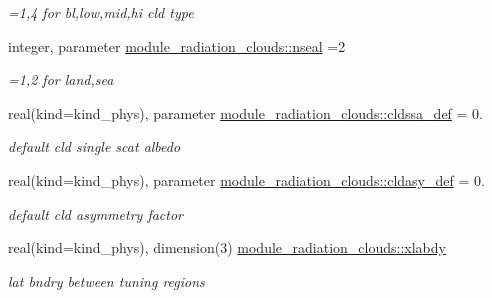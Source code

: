 \begin{DoxyCompactItemize}
\begin{DoxyCompactList}\small\item\em =1,4 for bl,low,mid,hi cld type \end{DoxyCompactList}\item 
\mbox{\label{group__module__radiation__clouds_gaaf2a6549a8c42b9eae3d40d21d1e9532}} 
integer, parameter \hyperlink{group__module__radiation__clouds_gaaf2a6549a8c42b9eae3d40d21d1e9532}{module\+\_\+radiation\+\_\+clouds\+::nseal} =2
\begin{DoxyCompactList}\small\item\em =1,2 for land,sea \end{DoxyCompactList}\item 
\mbox{\label{group__module__radiation__clouds_ga2ce850be46f0144caa09309ae01958c2}} 
real(kind=kind\+\_\+phys), parameter \hyperlink{group__module__radiation__clouds_ga2ce850be46f0144caa09309ae01958c2}{module\+\_\+radiation\+\_\+clouds\+::cldssa\+\_\+def} = 0.
\begin{DoxyCompactList}\small\item\em default cld single scat albedo \end{DoxyCompactList}\item 
\mbox{\label{group__module__radiation__clouds_gab94e45a81d8be82b6cb686b35fd78a80}} 
real(kind=kind\+\_\+phys), parameter \hyperlink{group__module__radiation__clouds_gab94e45a81d8be82b6cb686b35fd78a80}{module\+\_\+radiation\+\_\+clouds\+::cldasy\+\_\+def} = 0.
\begin{DoxyCompactList}\small\item\em default cld asymmetry factor \end{DoxyCompactList}\item 
\mbox{\label{group__module__radiation__clouds_gab2a798da0bb0125d1d5074b73c5951dc}} 
real(kind=kind\+\_\+phys), dimension(3) \hyperlink{group__module__radiation__clouds_gab2a798da0bb0125d1d5074b73c5951dc}{module\+\_\+radiation\+\_\+clouds\+::xlabdy}
\begin{DoxyCompactList}\small\item\em lat bndry between tuning regions \end{DoxyCompactList}\item 

\end{DoxyCompactItemize}
